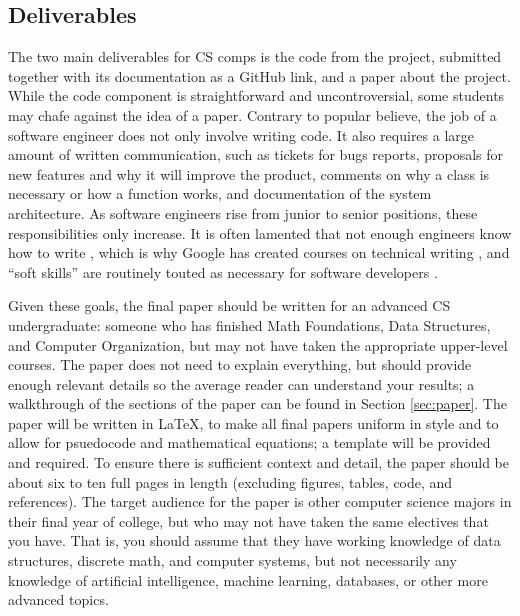 \documentclass[10pt,twocolumn]{article}
\begin{document}
\subsection{Deliverables}

The two main deliverables for CS comps is the code from the project, submitted together with its documentation as a GitHub link, and a paper about the project.
While the code component is straightforward and uncontroversial, some students may chafe against the idea of a paper.
Contrary to popular believe, the job of a software engineer does not only involve writing code.
It also requires a large amount of written communication, such as tickets for bugs reports, proposals for new features and why it will improve the product, comments on why a class is necessary or how a function works, and documentation of the system architecture.
As software engineers rise from junior to senior positions, these responsibilities only increase.
It is often lamented that not enough engineers know how to write \cite{Mei2018WhyDevelopersShould,Alton2020WhyEveryDeveloper}, which is why Google has created courses on technical writing \cite{GoogleTechnicalWriting}, and ``soft skills'' are routinely touted as necessary for software developers \cite{Indeed202111ImportantSoft}.

Given these goals, the final paper should be written for an advanced CS undergraduate: someone who has finished Math Foundations, Data Structures, and Computer Organization, but may not have taken the appropriate upper-level courses.
The paper does not need to explain everything, but should provide enough relevant details so the average reader can understand your results; a walkthrough of the sections of the paper can be found in Section \ref{sec:paper}.
The paper will be written in LaTeX, to make all final papers uniform in style and to allow for psuedocode and mathematical equations; a template will be provided and required.
To ensure there is sufficient context and detail, the paper should be about six to ten full pages in length (excluding figures, tables, code, and references).
The target audience for the paper is other computer science majors in their final year of college, but who may not have taken the same electives that you have.
That is, you should assume that they have working knowledge of data structures, discrete math, and computer systems, but not necessarily any knowledge of artificial intelligence, machine learning, databases, or other more advanced topics.
\end{document}
